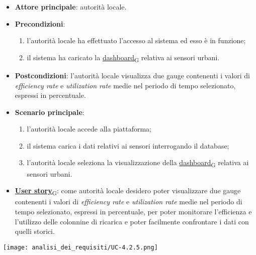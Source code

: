 \newpage
{}
\begin{itemize}
	\item \textbf{Attore principale}: autorità locale.
	\item \textbf{Precondizioni}:
	      \begin{enumerate}
		      \item l'autorità locale ha effettuato l'accesso al sistema ed esso è in funzione;
		      \item il sistema ha caricato la \href{https://7last.github.io/docs/pb/documentazione-interna/glossario\#dashboard}{dashboard\textsubscript{G}} relativa ai sensori urbani.
	      \end{enumerate}
	\item \textbf{Postcondizioni}: l'autorità locale visualizza due gauge contenenti i valori di \textit{efficiency rate} e \textit{utilization rate} medie nel periodo di tempo selezionato, espressi in percentuale.
	\item \textbf{Scenario principale}:
	      \begin{enumerate}
		      \item l'autorità locale accede alla piattaforma;
		      \item il sistema carica i dati relativi ai sensori interrogando il database;
		      \item l'autorità locale seleziona la visualizzazione della \href{https://7last.github.io/docs/pb/documentazione-interna/glossario\#dashboard}{dashboard\textsubscript{G}} relativa ai sensori urbani.
	      \end{enumerate}
	\item \href{https://7last.github.io/docs/pb/documentazione-interna/glossario\#user-story}{\textbf{User story}\textsubscript{G}}:
	      come autorità locale desidero poter visualizzare due gauge contenenti i valori di \textit{efficiency rate} e \textit{utilization rate} medie nel periodo di tempo selezionato, espressi in percentuale, per poter monitorare l'efficienza e l'utilizzo delle colonnine di ricarica e poter facilmente confrontare i dati con quelli storici.
\end{itemize}
\begin{center}
	\texttt{[image: analisi\_dei\_requisiti/UC-4.2.5.png]}
\end{center}


